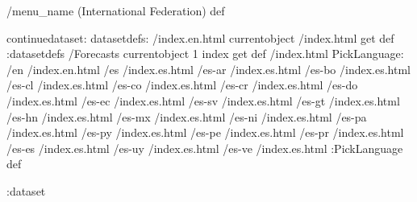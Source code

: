 \begin{ingrid}
/menu_name (International Federation) def

continuedataset:
datasetdefs:
/index.en.html currentobject /index.html get def
:datasetdefs
/Forecasts currentobject 1 index get def
/index.html {
PickLanguage:
/en /index.en.html
/es /index.es.html
/es-ar /index.es.html
/es-bo /index.es.html
/es-cl /index.es.html
/es-co /index.es.html
/es-cr /index.es.html
/es-do /index.es.html
/es-ec /index.es.html
/es-sv /index.es.html
/es-gt /index.es.html
/es-hn /index.es.html
/es-mx /index.es.html
/es-ni /index.es.html
/es-pa /index.es.html
/es-py /index.es.html
/es-pe /index.es.html
/es-pr /index.es.html
/es-es /index.es.html
/es-uy /index.es.html
/es-ve /index.es.html
:PickLanguage
} def

:dataset

\end{ingrid}
